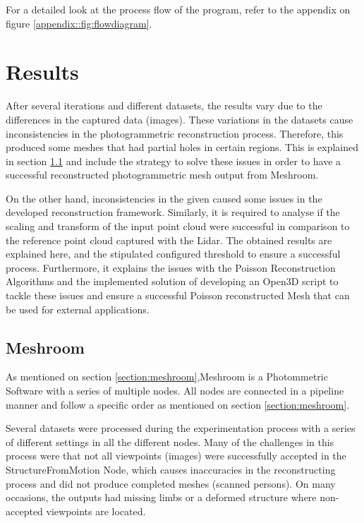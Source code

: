 \documentclass[12pt]{report}
\begin{document}
For a detailed look at the process flow of the program, refer to the appendix on figure \ref{appendix::fig:flowdiagram}.




\chapter{Results}
After several iterations and different datasets, the results vary due to the differences in the captured data (images). 
These variations in the datasets cause inconsistencies in the photogrammetric reconstruction process. Therefore, this produced some meshes that had partial holes in certain regions.
This is explained in section \ref{section:meshroom_results} and include the strategy to solve these issues in order to have a successful reconstructed photogrammetric mesh output from Meshroom.

On the other hand, inconsistencies in the given caused some issues in the developed reconstruction framework.
Similarly, it is required to analyse if the scaling and transform of the input point cloud were successful in comparison to the reference point cloud captured with the Lidar. 
The obtained results are explained here, and the stipulated configured threshold to ensure a successful process.
Furthermore, it explains the issues with the Poisson Reconstruction Algorithms and the implemented solution of developing an Open3D script to tackle these issues and ensure a successful Poisson reconstructed Mesh that can be used for external applications. 



\section{Meshroom}
\label{section:meshroom_results}
As mentioned on section \ref{section:meshroom},Meshroom is a Photommetric Software with a series of multiple nodes. All  nodes are connected in a pipeline manner and follow a specific order as mentioned on section \ref{section:meshroom}.

Several datasets were processed during the experimentation process with a series of different settings in all the different nodes. 
Many of the challenges in this process were that not all viewpoints (images) were successfully accepted in the StructureFromMotion Node, which causes inaccuracies in the reconstructing process and did not produce completed meshes (scanned persons).
On many occasions, the outputs had missing limbs or a deformed structure where non-accepted viewpoints are located.
\end{document}
